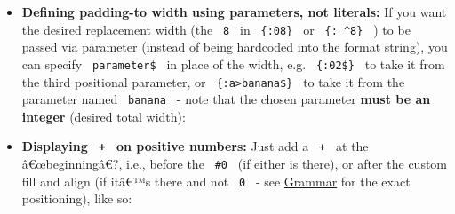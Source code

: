 \begin{itemize}
\tightlist
\item
  \textbf{Defining padding-to width using parameters, not literals:} If
  you want the desired replacement width (the \texttt{\ 8\ } in
  \texttt{\ \{:08\}\ } or \texttt{\ \{:\ \^{}8\}\ } ) to be passed via
  parameter (instead of being hardcoded into the format string), you can
  specify \texttt{\ parameter\$\ } in place of the width, e.g.
  \texttt{\ \{:02\$\}\ } to take it from the third positional parameter,
  or \texttt{\ \{:a\textgreater{}banana\$\}\ } to take it from the
  parameter named \texttt{\ banana\ } - note that the chosen parameter
  \textbf{must be an integer} (desired total width):
\end{itemize}

\begin{Shaded}
\begin{Highlighting}[]

\end{Highlighting}
\end{Shaded}

\begin{itemize}
\tightlist
\item
  \textbf{Displaying \texttt{\ +\ } on positive numbers:} Just add a
  \texttt{\ +\ } at the â€œbeginningâ€?, i.e., before the
  \texttt{\ \#0\ } (if either is there), or after the custom fill and
  align (if itâ€™s there and not \texttt{\ 0\ } - see
  \href{https://github.com/typst/packages/raw/main/packages/preview/oxifmt/0.2.1/\#grammar}{Grammar}
  for the exact positioning), like so:
\end{itemize}

\begin{Shaded}
\begin{Highlighting}[]

\end{Highlighting}
\end{Shaded}

